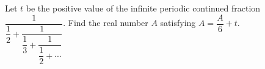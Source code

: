 Let $ t $ be the positive value of the infinite periodic continued fraction $\dfrac{1}{\dfrac{1}{2}+\dfrac{1}{\dfrac{1}{3}+\dfrac{1}{\dfrac{1}{2}+\cdots}}}$. Find the real number $ A $ satisfying $ A=\dfrac{A}{6}+t $.
